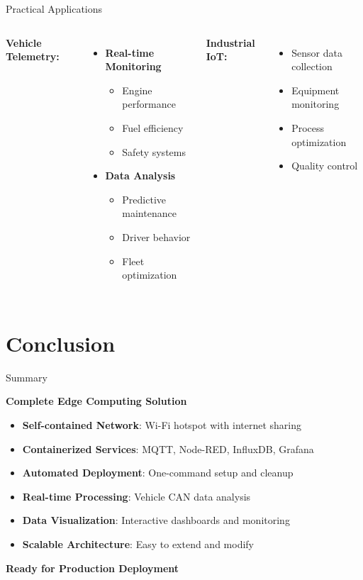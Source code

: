 \documentclass[aspectratio=169]{beamer}
\begin{document}
\begin{frame}{Practical Applications}
\begin{columns}
\textbf{Vehicle Telemetry:}
\begin{itemize}
    \item \textbf{Real-time Monitoring}
    \begin{itemize}
        \item Engine performance
        \item Fuel efficiency
        \item Safety systems
    \end{itemize}
    \item \textbf{Data Analysis}
    \begin{itemize}
        \item Predictive maintenance
        \item Driver behavior
        \item Fleet optimization
    \end{itemize}
\end{itemize}

\textbf{Industrial IoT:}
\begin{itemize}
    \item Sensor data collection
    \item Equipment monitoring
    \item Process optimization
    \item Quality control
\end{itemize}
\end{columns}
\end{frame}

\section{Conclusion}

\begin{frame}{Summary}
\begin{center}
\textbf{Complete Edge Computing Solution}
\end{center}

\vspace{0.5cm}
\begin{itemize}
    \item \textbf{Self-contained Network}: Wi-Fi hotspot with internet sharing
    \item \textbf{Containerized Services}: MQTT, Node-RED, InfluxDB, Grafana
    \item \textbf{Automated Deployment}: One-command setup and cleanup
    \item \textbf{Real-time Processing}: Vehicle CAN data analysis
    \item \textbf{Data Visualization}: Interactive dashboards and monitoring
    \item \textbf{Scalable Architecture}: Easy to extend and modify
\end{itemize}

\vspace{1cm}
\begin{center}
\textbf{Ready for Production Deployment}
\end{center}
\end{frame}
\end{document}
